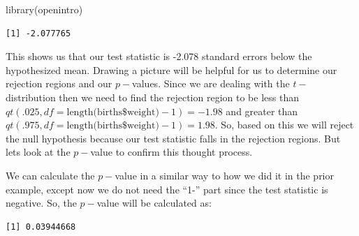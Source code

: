 \documentclass[
  letterpaper,
  DIV=11,
  numbers=noendperiod]{scrreprt}
\newenvironment{Shaded}{\begin{snugshade}}{\end{snugshade}}
\newcommand{\AttributeTok}[1]{\textcolor[rgb]{0.40,0.45,0.13}{#1}}
\newcommand{\DecValTok}[1]{\textcolor[rgb]{0.68,0.00,0.00}{#1}}
\newcommand{\FloatTok}[1]{\textcolor[rgb]{0.68,0.00,0.00}{#1}}
\newcommand{\FunctionTok}[1]{\textcolor[rgb]{0.28,0.35,0.67}{#1}}
\newcommand{\NormalTok}[1]{\textcolor[rgb]{0.00,0.23,0.31}{#1}}
\newcommand{\OtherTok}[1]{\textcolor[rgb]{0.00,0.23,0.31}{#1}}
\newcommand{\SpecialCharTok}[1]{\textcolor[rgb]{0.37,0.37,0.37}{#1}}
\begin{document}
\begin{Shaded}
\begin{Highlighting}[]
\FunctionTok{library}\NormalTok{(openintro)}
\end{Highlighting}
\end{Shaded}

\begin{Shaded}
\end{Shaded}

\begin{verbatim}
[1] -2.077765
\end{verbatim}

This shows us that our test statistic is -2.078 standard errors below
the hypothesized mean. Drawing a picture will be helpful for us to
determine our rejection regions and our \(p-\)values. Since we are
dealing with the \(t-\)distribution then we need to find the rejection
region to be less than
\(qt(.025, df=\text{length(births\$weight)}-1)=-1.98\) and greater than
\(qt(.975, df=\text{length(births\$weight)}-1)=1.98\). So, based on this
we will reject the null hypothesis because our test statistic falls in
the rejection regions. But lets look at the \(p-\)value to confirm this
thought process.

We can calculate the \(p-\)value in a similar way to how we did it in
the prior example, except now we do not need the ``1-'' part since the
test statistic is negative. So, the \(p-\)value will be calculated as:

\begin{Shaded}
\end{Shaded}

\begin{verbatim}
[1] 0.03944668
\end{verbatim}
\end{document}
